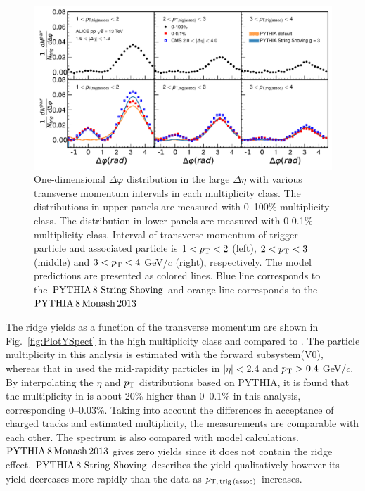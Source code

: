 \begin{figure}[h!]
	\centering
	\includegraphics[width=0.99\linewidth]{./figures/Fig2_PlotDeltaPhi.pdf}
	\caption{One-dimensional $\Delta\varphi$ distribution in the large $\Delta\eta$ with various transverse momentum intervals in each multiplicity class. The distributions in upper panels are measured with 0--100\% multiplicity class. The distribution in lower panels are measured with 0-0.1\% multiplicity class. Interval of transverse momentum of trigger particle and associated particle is $1<p_\mathrm{T}<2$ (left), $2<p_\mathrm{T}<3$ (middle) and $3<p_\mathrm{T}<4$ GeV/$c$ (right), respectively. The model predictions are presented as colored lines. Blue line corresponds to the $\mathrm{PYTHIA}\,8~\mathrm{String}~\mathrm{Shoving}$ and orange line corresponds to the $\mathrm{PYTHIA}\,8\,\mathrm{Monash}\,2013$}
	\label{fig:PlotDeltaPhi}
\end{figure}
 
The ridge yields as a function of  the transverse momentum are shown in Fig.~\ref{fig:PlotYSpect} in the high multiplicity class and compared to \cite{Khachatryan:2015lva}. The particle multiplicity in this analysis is estimated with the forward subsystem(V0), whereas that in \cite{Khachatryan:2015lva}  used the mid-rapidity particles in $|\eta|<$2.4 and $p_\mathrm{T}>0.4$ GeV/$c$. By interpolating the $\eta$ and $p_\mathrm{T}{}$ distributions based on PYTHIA, it is found that the multiplicity in \cite{Khachatryan:2015lva} is about 20\% higher than 0--0.1\% in this analysis, corresponding 0--0.03\%. Taking into account the differences in acceptance of charged tracks and estimated multiplicity, the measurements are comparable with each other. The spectrum is also compared with model calculations. $\mathrm{PYTHIA}\,8\,\mathrm{Monash}\,2013$ gives zero yields since it does not contain the ridge effect. $\mathrm{PYTHIA}\,8~\mathrm{String}~\mathrm{Shoving}$ describes the yield qualitatively however its yield decreases more rapidly than the data as $p_\mathrm{T,\,trig\,(assoc)}$ increases.

